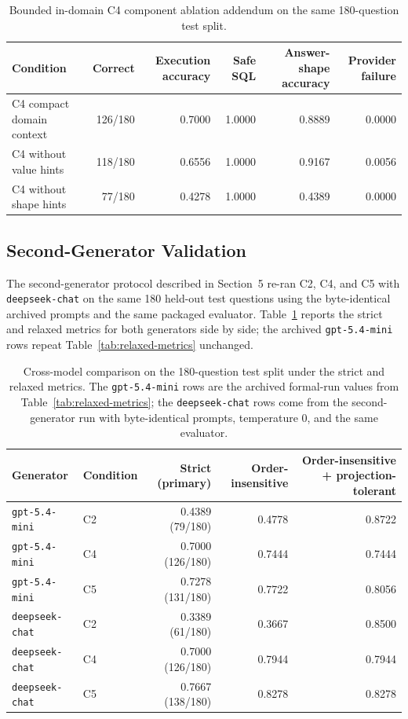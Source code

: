 \documentclass{ieeeaccess}
\begin{document}
\begin{table}[t]
\caption{Bounded in-domain C4 component ablation addendum on the same 180-question test split.}
\centering
\small
\begin{tabular*}{\textwidth}{@{\extracolsep{\fill}}lrrrrr}
\toprule
Condition & Correct & Execution accuracy & Safe SQL & Answer-shape accuracy & Provider failure \\
\midrule
C4 compact domain context & 126/180 & 0.7000 & 1.0000 & 0.8889 & 0.0000 \\
C4 without value hints & 118/180 & 0.6556 & 1.0000 & 0.9167 & 0.0056 \\
C4 without shape hints & 77/180 & 0.4278 & 1.0000 & 0.4389 & 0.0000 \\
\bottomrule
\end{tabular*}
\end{table}

\subsection{Second-Generator Validation}\label{second-generator-validation}

The second-generator protocol described in Section~5 re-ran C2, C4, and C5 with \texttt{deepseek-chat} on the same 180 held-out test questions using the byte-identical archived prompts and the same packaged evaluator. Table~\ref{tab:second-model} reports the strict and relaxed metrics for both generators side by side; the archived \texttt{gpt-5.4-mini} rows repeat Table~\ref{tab:relaxed-metrics} unchanged.

\begin{table}[t]
\caption{Cross-model comparison on the 180-question test split under the strict and relaxed metrics. The \texttt{gpt-5.4-mini} rows are the archived formal-run values from Table~\ref{tab:relaxed-metrics}; the \texttt{deepseek-chat} rows come from the second-generator run with byte-identical prompts, temperature 0, and the same evaluator.}
\label{tab:second-model}
\centering
\small
\begin{tabular*}{\textwidth}{@{\extracolsep{\fill}}llrrr}
\toprule
Generator & Condition & Strict (primary) & Order-insensitive & Order-insensitive + projection-tolerant \\
\midrule
\texttt{gpt-5.4-mini} & C2 & 0.4389 (79/180) & 0.4778 & 0.8722 \\
\texttt{gpt-5.4-mini} & C4 & 0.7000 (126/180) & 0.7444 & 0.7444 \\
\texttt{gpt-5.4-mini} & C5 & 0.7278 (131/180) & 0.7722 & 0.8056 \\
\midrule
\texttt{deepseek-chat} & C2 & 0.3389 (61/180) & 0.3667 & 0.8500 \\
\texttt{deepseek-chat} & C4 & 0.7000 (126/180) & 0.7944 & 0.7944 \\
\texttt{deepseek-chat} & C5 & 0.7667 (138/180) & 0.8278 & 0.8278 \\
\bottomrule
\end{tabular*}
\end{table}
\end{document}

